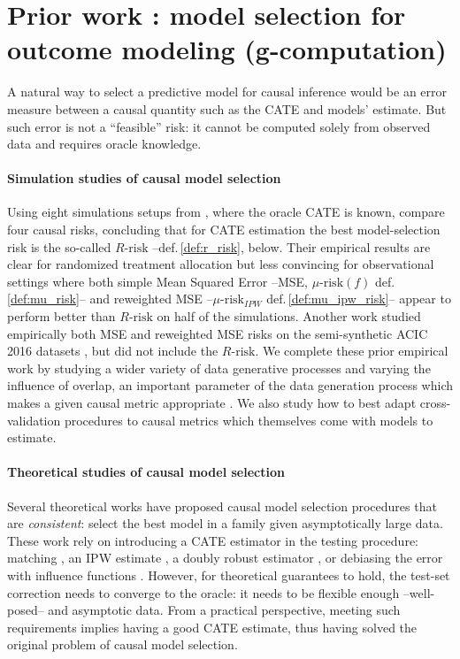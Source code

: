 \documentclass[11pt]{article}
\let\cite=\supercite
\begin{document}
\section{Prior work : model selection for outcome modeling (g-computation)}\label{apd:prior_work}

A natural way to select a predictive model for causal inference would be
an error measure between a causal quantity such as the CATE and models' estimate. But such error is
not a ``feasible'' risk: it cannot be computed solely from observed data
and requires oracle knowledge.


\paragraph{Simulation studies of causal model selection}

Using eight simulations setups from \cite{powers_methods_2018}, where
the oracle CATE is known, \citet{schuler_comparison_2018} compare four
causal risks, concluding that for CATE estimation the best
model-selection risk is the so-called $R\text{-risk}$
\cite{nie_quasioracle_2017} --def.\,\ref{def:r_risk}, below. Their
empirical results are clear for randomized treatment allocation but less
convincing for observational settings where both simple Mean Squared
Error --MSE, $\mu\text{-risk}(f)$ def.\,\ref{def:mu_risk}-- and
reweighted MSE --$\mu\text{-risk}_{IPW}$ def.\,\ref{def:mu_ipw_risk}--
appear to perform better than $R\text{-risk}$ on half of the simulations.
Another work \cite{alaa_validating_2019} studied empirically both MSE and
reweighted MSE risks on the semi-synthetic ACIC 2016 datasets
\cite{dorie_automated_2019}, but did not include the $R\text{-risk}$. We complete these
prior empirical work by studying a wider variety of data generative
processes and varying the influence of overlap, an important parameter of
the data generation process which makes a given causal metric appropriate
\cite{damour_overlap_2020}. We also study how to best adapt
cross-validation procedures to causal metrics which themselves come with
models to estimate.

\paragraph{Theoretical studies of causal model selection}

Several theoretical works have proposed causal model selection procedures
that are \emph{consistent}: select the best model in a family given
asymptotically large data. These work rely on introducing a
CATE estimator in the testing procedure: matching
\citep{rolling_model_2014}, an IPW estimate
\citep{gutierrez_causal_2016}, a doubly robust estimator
\citep{saito_counterfactual_2020}, or debiasing the error with influence
functions \cite{alaa_validating_2019}. However, for theoretical
guarantees to hold, the test-set correction needs to converge to the
oracle: it needs to be flexible enough --well-posed-- and asymptotic
data. From a practical perspective, meeting such requirements
implies having a good CATE estimate, thus having solved
the original problem of causal model selection.
\end{document}
